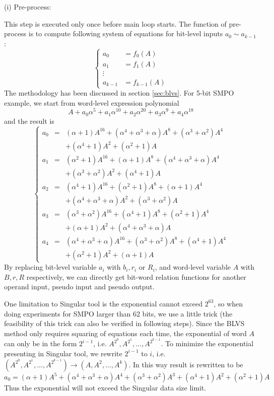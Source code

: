 (i) Pre-process:

This step is executed only once before main loop starts. The function of pre-process is to compute following system
of equations for bit-level inputs $a_0 \sim a_{k-1}$:
\begin{displaymath}
\left\{
  \begin{array}{ll}
  a_0 & = f_0(A)\\
  a_1 & = f_1(A)\\
  \vdots & \ \\
  a_{k-1} & = f_{k-1}(A)
  \end{array} \right.
\end{displaymath}
The methodology has been discussed in section \ref{sec:blvs}. For 5-bit SMPO example, we start from word-level
expression polynomial
\begin{displaymath}
A + a_0\alpha^5+a_1\alpha^{10}+a_2\alpha^{20}+a_3\alpha^9+a_4\alpha^{18}
\end{displaymath}
and the result is
\begin{displaymath}
\left\{
  \begin{array}{lcl}
  a_0 & = & (\alpha+1)A^{16}+(\alpha^4+\alpha^3+\alpha)A^8+(\alpha^3+\alpha^2)A^4\\&&+(\alpha^4+1)A^2+(\alpha^2+1)A\\
  a_1 & = & (\alpha^2+1)A^{16}+(\alpha+1)A^8+(\alpha^4+\alpha^3+\alpha)A^4\\&&+(\alpha^3+\alpha^2)A^2+(\alpha^4+1)A\\
  a_2 & = & (\alpha^4+1)A^{16}+(\alpha^2+1)A^8+(\alpha+1)A^4\\&&+(\alpha^4+\alpha^3+\alpha)A^2+(\alpha^3+\alpha^2)A\\
  a_3 & = & (\alpha^3+\alpha^2)A^{16}+(\alpha^4+1)A^8+(\alpha^2+1)A^4\\&&+(\alpha+1)A^2+(\alpha^4+\alpha^3+\alpha)A\\
  a_4 & = & (\alpha^4+\alpha^3+\alpha)A^{16}+(\alpha^3+\alpha^2)A^8+(\alpha^4+1)A^4\\&&+(\alpha^2+1)A^2+(\alpha+1)A
  \end{array} \right.
\end{displaymath}
By replacing bit-level variable $a_i$ with $b_i, r_i$ or $R_i$, and word-level variable $A$ with $B, r, R$ respectively,
we can directly get bit-word relation functions for another operand input, pseudo input and pseudo output.

One limitation to Singular tool is the exponential cannot exceed $2^{63}$, so when doing experiments for SMPO larger than
62 bits, we use a little trick (the feasibility of this trick can also be verified in following steps). Since the BLVS method
only requires squaring of equations each time, the exponential of word $A$ can only be in the form $2^{i-1}$, i.e. 
$A^{2^0},A^{2^1},\dots,A^{2^{k-1}}$. To minimize the exponential presenting in Singular tool, we rewrite $2^{i-1}$ to $i$, i.e.
$(A^{2^0},A^{2^1},\dots,A^{2^{k-1}}) \to (A, A^2, \dots, A^k)$. In this way result is rewritten to be
$$a_0 = (\alpha+1)A^5+(\alpha^4+\alpha^3+\alpha)A^4+(\alpha^3+\alpha^2)A^3+(\alpha^4+1)A^2+(\alpha^2+1)A$$
Thus the exponential will not exceed the Singular data size limit.

